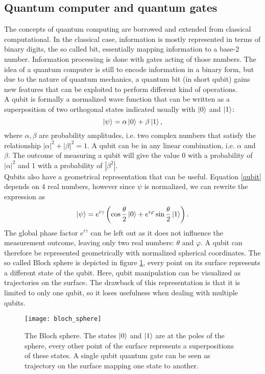 \subsection{Quantum computer and quantum gates}
The concepts of quantum computing are borrowed and extended from classical computational. In the classical case, information is mostly represented in terms of binary digits, the so called bit, essentially mapping information to a base-2 number. Information processing is done with gates acting of those numbers. The idea of a quantum computer is still to encode information in a binary form, but due to the nature of quantum mechanics, a quantum bit (in short qubit) gains new features that can be exploited to perform different kind of operations.\\
A qubit is formally a normalized wave function that can be written as a superposition of two orthogonal states indicated usually with $\ket{0}$ and $\ket{1}$:
\begin{equation}
\label{qubit}
\ket{\psi} = \alpha \ket{0} + \beta\ket{1},
\end{equation}
where $\alpha,\beta$ are probability amplitudes, i.e. two complex numbers that satisfy the relationship $|\alpha|^2+|\beta|^2 = 1$.
A qubit can be in any linear combination, i.e. $\alpha$ and $\beta$. The outcome of measuring a qubit will give the value 0 with a probability of $|\alpha|^2$ and 1 with a probability of $|\beta^2|$.\\
Qubits also have a geometrical representation that can be useful. Equation \eqref{qubit} depends on 4 real numbers, however since $\psi$ is normalized, we can rewrite the expression as
\begin{equation}
\ket{\psi} = e^{i\gamma}\left(\cos\frac{\theta}{2}\ket{0} + e^{i\varphi}\sin\frac{\theta}{2}\ket{1}\right).
\end{equation}
The global phase factor $e^{i\gamma}$ can be left out as it does not influence the measurement outcome, leaving only two real numbers: $\theta$ and $\varphi$. A qubit can therefore be represented geometrically with normalized spherical coordinates. The so called Bloch sphere is depicted in figure \ref{blochsphere}, every point on its surface represents a different state of the qubit. Here, qubit manipulation can be visualized as trajectories on the surface. The drawback of this representation is that it is limited to only one qubit, so it loses usefulness when dealing with multiple qubits.
\begin{figure}[H]
\centering
\texttt{[image: bloch\_sphere]}
\caption{The Bloch sphere. The states $\ket{0}$ and $\ket{1}$ are at the poles of the sphere, every other point of the surface represents a superpositions of these states. A single qubit quantum gate can be seen as trajectory on the surface mapping one state to another.}
\label{blochsphere}
\end{figure}

